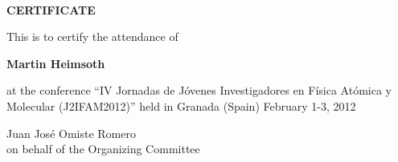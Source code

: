 \documentclass [13pt,a4paper] {letter}
\begin{document}
\pagestyle{empty} 
\begin{verbatim}







\end{verbatim}
\pagestyle{empty}
\begin{center}
{\bf {\Huge CERTIFICATE}}

\vspace {1.5cm}
This is to certify the attendance of
\vspace {1cm}

{\bf \Large  Martin    Heimsoth }
\vspace {1cm}

at the conference { \textquotedblleft IV Jornadas de Jóvenes Investigadores en Física Atómica y Molecular (J2IFAM2012)\textquotedblright} 
held in Granada (Spain) February 1-3, 2012
\end{center}
\vspace {4cm}
\begin{raggedleft}
Juan José Omiste Romero\\
on behalf of the Organizing Committee
\newpage
\end{raggedleft}
\end{document}
